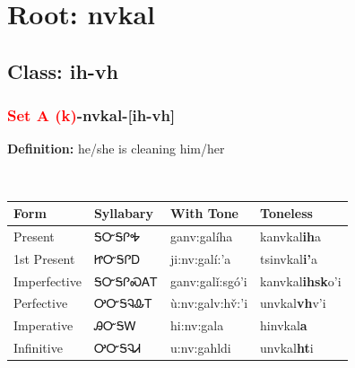 \needspace{4in}
\section*{Root: nvkal}
\nopagebreak
{}
\needspace{3in}
\subsection*{Class: ih-vh}
\nopagebreak
\needspace{2in}
\subsubsection*{\textcolor{Red}{Set A (k)}{-}\textbf{nvkal}{-}[ih-vh]}
\nopagebreak
\textbf{Definition: } he/she is cleaning him/her
\\[0.5em]
\begin{tabularx}{\textwidth}{l X X X}%
\toprule%
\textbf{Form}&\textbf{Syllabary}&\textbf{With Tone}&\textbf{Toneless}\\%
\midrule%
Present&ᎦᏅᎦᎵᎭ&ganv:galíha&kanvkal\textbf{ih}a\\%
1st Present&ᏥᏅᎦᎵᎠ&ji:nv:galí:’a&tsinvkal\textbf{i'}a\\%
Imperfective&ᎦᏅᎦᎵᏍᎪᎢ&ganv:galǐ:sgó’i&kanvkal\textbf{ihsk}o'i\\%
Perfective&ᎤᏅᎦᎸᎲᎢ&ù:nv:galv:hv̌:’i&unvkal\textbf{vh}v'i\\%
Imperative&ᎯᏅᎦᎳ&hi:nv:gala&hinvkal\textbf{a}\\%
Infinitive&ᎤᏅᎦᎸᏗ&u:nv:gahldi&unvkal\textbf{ht}i\\%
\bottomrule%
\end{tabularx}
\\[1em]